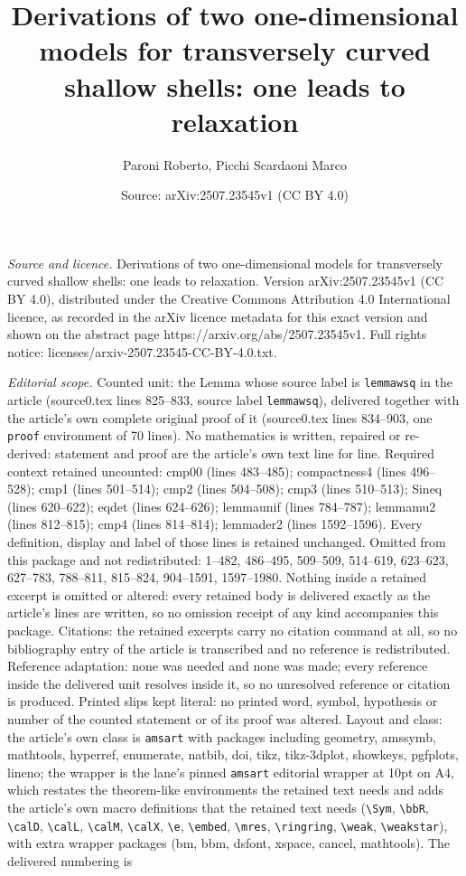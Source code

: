 \documentclass[10pt,a4paper]{amsart}
\title[Derivations of two one-dimensional models for transversely c]{Derivations of two one-dimensional models for transversely curved shallow shells: one leads to relaxation}
\author{Paroni Roberto, Picchi Scardaoni Marco}
\date{Source: arXiv:2507.23545v1 (CC BY 4.0)}
\begin{document}
\maketitle

\noindent\emph{Source and licence.} Derivations of two one-dimensional models for transversely curved shallow shells: one leads to relaxation. Version arXiv:2507.23545v1 (CC BY 4.0), distributed under the Creative Commons Attribution 4.0 International licence, as recorded in the arXiv licence metadata for this exact version and shown on the abstract page https://arxiv.org/abs/2507.23545v1. Full rights notice: licenses/arxiv-2507.23545-CC-BY-4.0.txt.\par\smallskip

\noindent\textit{Editorial scope.} Counted unit: the Lemma whose source label is \texttt{lemmawsq} in the article (source0.tex lines 825--833, source label \texttt{lemmawsq}), delivered together with the article's own complete original proof of it (source0.tex lines 834--903, one \texttt{proof} environment of 70 lines). No mathematics is written, repaired or re-derived: statement and proof are the article's own text line for line. Required context retained uncounted: cmp00 (lines 483--485); compactness4 (lines 496--528); cmp1 (lines 501--514); cmp2 (lines 504--508); cmp3 (lines 510--513); Sineq (lines 620--622); eqdet (lines 624--626); lemmaunif (lines 784--787); lemmamu2 (lines 812--815); cmp4 (lines 814--814); lemmader2 (lines 1592--1596). Every definition, display and label of those lines is retained unchanged. Omitted from this package and not redistributed: 1--482, 486--495, 509--509, 514--619, 623--623, 627--783, 788--811, 815--824, 904--1591, 1597--1980. Nothing inside a retained excerpt is omitted or altered: every retained body is delivered exactly as the article's lines are written, so no omission receipt of any kind accompanies this package. Citations: the retained excerpts carry no citation command at all, so no bibliography entry of the article is transcribed and no reference is redistributed. Reference adaptation: none was needed and none was made; every reference inside the delivered unit resolves inside it, so no unresolved reference or citation is produced. Printed slips kept literal: no printed word, symbol, hypothesis or number of the counted statement or of its proof was altered. Layout and class: the article's own class is \texttt{amsart} with packages including geometry, amssymb, mathtools, hyperref, enumerate, natbib, doi, tikz, tikz-3dplot, showkeys, pgfplots, lineno; the wrapper is the lane's pinned \texttt{amsart} editorial wrapper at 10pt on A4, which restates the theorem-like environments the retained text needs and adds the article's own macro definitions that the retained text needs (\texttt{\textbackslash Sym}, \texttt{\textbackslash bbR}, \texttt{\textbackslash calD}, \texttt{\textbackslash calL}, \texttt{\textbackslash calM}, \texttt{\textbackslash calX}, \texttt{\textbackslash e}, \texttt{\textbackslash embed}, \texttt{\textbackslash mres}, \texttt{\textbackslash ringring}, \texttt{\textbackslash weak}, \texttt{\textbackslash weakstar}), with extra wrapper packages (bm, bbm, dsfont, xspace, cancel, mathtools). The delivered numbering is 
\end{document}

